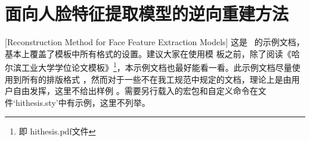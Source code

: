 
\chapter[面向人脸特征提取模型的逆向重建方法]{面向人脸特征提取模型的逆向重建方法}[Reconstruction Method for Face Feature Extraction Models]
这是 \hithesis\ 的示例文档，基本上覆盖了模板中所有格式的设置。建议大家在使用模
板之前，除了阅读《\hithesis\:哈尔滨工业大学学位论文模板》\footnote{即
hithesis.pdf文件}，本示例文档也最好能看一看。此示例文档尽量使用到所有的排版格式
，然而对于一些不在我工规范中规定的文档，理论上是由用户自由发挥，这里不给出样例
。需要另行载入的宏包和自定义命令在文件`hithesis.sty'中有示例，这里不列举。
